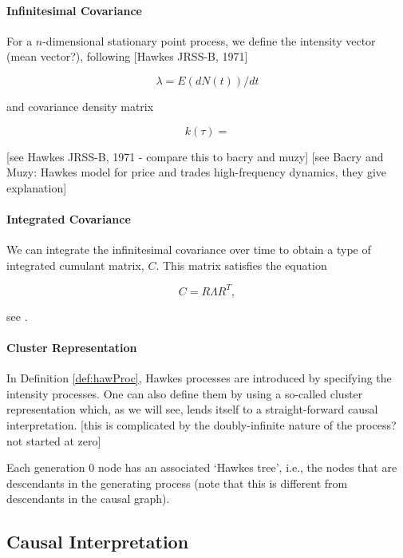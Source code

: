 \documentclass[accepted]{uai2021} %
\begin{document}

\paragraph{Infinitesimal Covariance}

For a $n$-dimensional stationary point process, we define the intensity vector 
(mean vector?), following [Hawkes JRSS-B, 1971]

$$
\lambda = E(dN(t))/dt
$$

\noindent and covariance density matrix

$$
k(\tau) = 
$$

[see Hawkes JRSS-B, 1971 - compare this to bacry and muzy]
[see  Bacry and Muzy: Hawkes model for price and trades high-frequency 
dynamics, they give explanation]


\paragraph{Integrated Covariance}

We can integrate the infinitesimal covariance over time to obtain a type of 
integrated cumulant matrix, $C$. This matrix satisfies the equation

$$
C = R \Lambda R^T,
$$

see \cite{jovanovic2015}.


\paragraph{Cluster Representation}

In Definition \ref{def:hawProc}, Hawkes processes are introduced by specifying 
the intensity processes. One can also define them by using a so-called cluster 
representation which, as we will see, lends itself to a straight-forward causal 
interpretation. [this is complicated by the doubly-infinite nature of the 
process? not started at zero]

Each 
generation 0 node has an associated `Hawkes tree', i.e., the nodes that are 
descendants in the generating process (note that this is different from 
descendants in the causal graph).





\subsection{Causal Interpretation}
\end{document}
